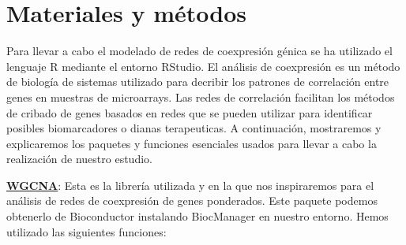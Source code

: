 
	\section{Materiales y métodos}
	
	Para llevar a cabo el modelado de redes de coexpresión génica se ha utilizado el lenguaje R mediante el entorno RStudio. El análisis de coexpresión es un método de biología de sistemas utilizado para decribir los patrones de correlación entre genes en muestras de microarrays. Las redes de correlación facilitan los métodos de cribado de genes basados en redes que se pueden utilizar para identificar posibles biomarcadores o dianas terapeuticas. A continuación, mostraremos y explicaremos los paquetes y funciones esenciales usados para llevar a cabo la realización de nuestro estudio.
	
	\underline{\bfseries{WGCNA}}: Esta es la librería utilizada y en la que nos inspiraremos para el análisis de redes de coexpresión de genes ponderados. Este paquete podemos obtenerlo de Bioconductor instalando BiocManager en nuestro entorno. Hemos utilizado las siguientes funciones:
	
